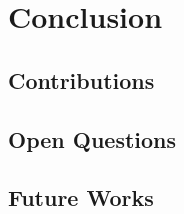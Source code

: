 
\chapter{Conclusion}

\section[Contributions]{Contributions}

\section[Open Questions]{Open Questions}

\section[Future Works]{Future Works}